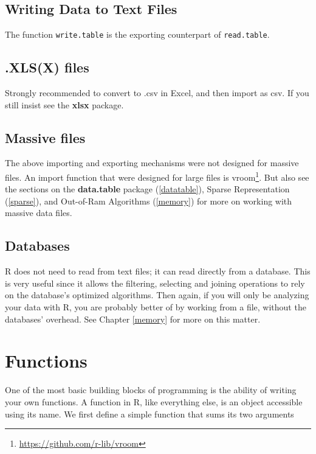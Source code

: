 \documentclass[]{book}
\renewcommand{\href}[2]{#2\footnote{\url{#1}}}
\theoremstyle{definition}
\theoremstyle{definition}
\theoremstyle{definition}
\theoremstyle{remark}
\begin{document}
\hypertarget{writing-data-to-text-files}{%
\subsection{Writing Data to Text Files}\label{writing-data-to-text-files}}

The function \texttt{write.table} is the exporting counterpart of \texttt{read.table}.

\hypertarget{xlsx-files}{%
\subsection{.XLS(X) files}\label{xlsx-files}}

Strongly recommended to convert to .csv in Excel, and then import as csv.
If you still insist see the \textbf{xlsx} package.

\hypertarget{massive-files}{%
\subsection{Massive files}\label{massive-files}}

The above importing and exporting mechanisms were not designed for massive files.
An import function that were designed for large files is \href{https://github.com/r-lib/vroom}{vroom}.
But also see the sections on the \textbf{data.table} package (\ref{datatable}), Sparse Representation (\ref{sparse}), and Out-of-Ram Algorithms (\ref{memory}) for more on working with massive data files.

\hypertarget{databases}{%
\subsection{Databases}\label{databases}}

R does not need to read from text files; it can read directly from a database.
This is very useful since it allows the filtering, selecting and joining operations to rely on the database's optimized algorithms.
Then again, if you will only be analyzing your data with R, you are probably better of by working from a file, without the databases' overhead.
See Chapter \ref{memory} for more on this matter.

\hypertarget{functions}{%
\section{Functions}\label{functions}}

One of the most basic building blocks of programming is the ability of writing your own functions.
A function in R, like everything else, is an object accessible using its name.
We first define a simple function that sums its two arguments
\end{document}
